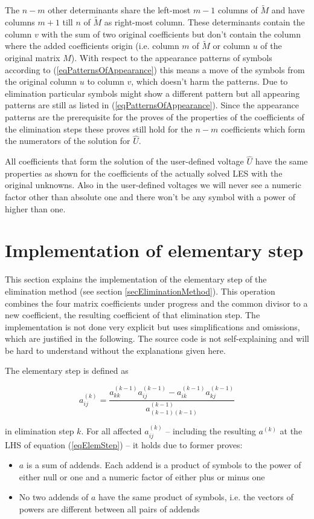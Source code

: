 The $n-m$ other determinants share the left-most $m-1$ columns of $\tilde
M$ and have columns $m+1$ till $n$ of $\tilde M$ as right-most column.
These determinants contain the column $v$ with the sum of two original
coefficients but don't contain the column where the added coefficients
origin (i.e. column $m$ of $\tilde M$ or column $u$ of the original matrix
$M$). With respect to the appearance patterns of symbols according to
(\ref{eqPatternsOfAppearance}) this means a move of the symbols from the
original column $u$ to column $v$, which doesn't harm the patterns. Due to
elimination particular symbols might show a different pattern but all
appearing patterns are still as listed in (\ref{eqPatternsOfAppearance}).
Since the appearance patterns are the prerequisite for the proves of the
properties of the coefficients of the elimination steps these proves still
hold for the $n-m$ coefficients which form the numerators of the solution
for $\hat U$.

All coefficients that form the solution of the user-defined voltage $\hat
U$ have the same properties as shown for the coefficients of the actually
solved LES with the original unknowns. Also in the user-defined voltages
we will never see a numeric factor other than absolute one and there won't
be any symbol with a power of higher than one.

\section{Implementation of elementary step}

This section explains the implementation of the elementary step of the
elimination method (see section \ref{secEliminationMethod}). This
operation combines the four matrix coefficients under progress and the
common divisor to a new coefficient, the resulting coefficient of that
elimination step. The implementation is not done very explicit but uses
simplifications and omissions, which are justified in the following. The
source code is not self-explaining and will be hard to understand without
the explanations given here.

The elementary step is defined as

\begin{equation}
\label{eqElemStep}
a^{(k)}_{ij} = \frac{a^{(k-1)}_{kk} a^{(k-1)}_{ij} - a^{(k-1)}_{ik} a^{(k-1)}_{kj}}
                    {a^{(k-1)}_{(k-1)(k-1)}}
\end{equation}

\noindent
in elimination step $k$. For all affected $a^{(k)}_{ij}$ -- including the
resulting $a^{(k)}$ at the LHS of equation (\ref{eqElemStep}) -- it holds
due to former proves:
\begin{itemize}
  \item $a$ is a sum of addends. Each addend is a product of symbols to
    the power of either null or one and a numeric factor of either plus or
    minus one
  \item No two addends of $a$ have the same product of symbols, i.e. the
    vectors of powers are different between all pairs of addends
\end{itemize}

